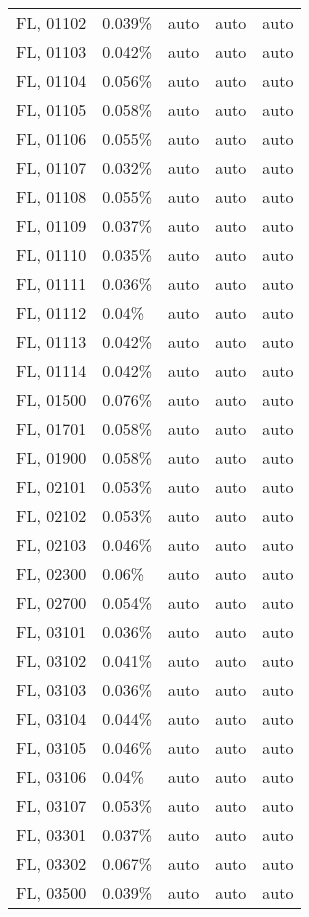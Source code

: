 \begin{longtable}[]{@{}lllll@{}}
FL, 01102 & 0.039\% & auto & auto & auto \\
FL, 01103 & 0.042\% & auto & auto & auto \\
FL, 01104 & 0.056\% & auto & auto & auto \\
FL, 01105 & 0.058\% & auto & auto & auto \\
FL, 01106 & 0.055\% & auto & auto & auto \\
FL, 01107 & 0.032\% & auto & auto & auto \\
FL, 01108 & 0.055\% & auto & auto & auto \\
FL, 01109 & 0.037\% & auto & auto & auto \\
FL, 01110 & 0.035\% & auto & auto & auto \\
FL, 01111 & 0.036\% & auto & auto & auto \\
FL, 01112 & 0.04\% & auto & auto & auto \\
FL, 01113 & 0.042\% & auto & auto & auto \\
FL, 01114 & 0.042\% & auto & auto & auto \\
FL, 01500 & 0.076\% & auto & auto & auto \\
FL, 01701 & 0.058\% & auto & auto & auto \\
FL, 01900 & 0.058\% & auto & auto & auto \\
FL, 02101 & 0.053\% & auto & auto & auto \\
FL, 02102 & 0.053\% & auto & auto & auto \\
FL, 02103 & 0.046\% & auto & auto & auto \\
FL, 02300 & 0.06\% & auto & auto & auto \\
FL, 02700 & 0.054\% & auto & auto & auto \\
FL, 03101 & 0.036\% & auto & auto & auto \\
FL, 03102 & 0.041\% & auto & auto & auto \\
FL, 03103 & 0.036\% & auto & auto & auto \\
FL, 03104 & 0.044\% & auto & auto & auto \\
FL, 03105 & 0.046\% & auto & auto & auto \\
FL, 03106 & 0.04\% & auto & auto & auto \\
FL, 03107 & 0.053\% & auto & auto & auto \\
FL, 03301 & 0.037\% & auto & auto & auto \\
FL, 03302 & 0.067\% & auto & auto & auto \\
FL, 03500 & 0.039\% & auto & auto & auto \\

\end{longtable}
